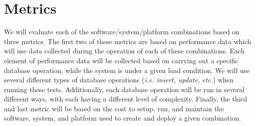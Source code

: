 \section{Metrics}
We will evaluate each of the software/system/platform combinations based on three metrics.  The first two of these metrics are based on performance data which will use data collected during the operation of each of these combinations.  Each element of performance data will be collected based on carrying out a specific database operation, while the system is under a given load condition.  We will use several different types of database operations (\emph{i.e. insert, update, etc.}) when running these tests.  Additionally, each database operation will be run in several different ways, with each having a different level of complexity.  Finally, the third and last metric will be based on the cost to setup, run, and maintain the software, system, and platform used to create and deploy a given combination.  

